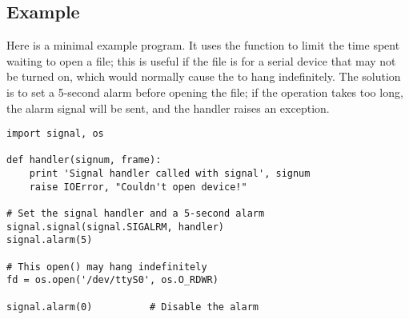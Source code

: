 \subsection{Example}

Here is a minimal example program. It uses the 
function to limit the time spent waiting to open a file; this is
useful if the file is for a serial device that may not be turned on,
which would normally cause the  to hang
indefinitely.  The solution is to set a 5-second alarm before opening
the file; if the operation takes too long, the alarm signal will be
sent, and the handler raises an exception.

\begin{verbatim}
import signal, os

def handler(signum, frame):
    print 'Signal handler called with signal', signum
    raise IOError, "Couldn't open device!"

# Set the signal handler and a 5-second alarm
signal.signal(signal.SIGALRM, handler)
signal.alarm(5)

# This open() may hang indefinitely
fd = os.open('/dev/ttyS0', os.O_RDWR)  

signal.alarm(0)          # Disable the alarm
\end{verbatim}
